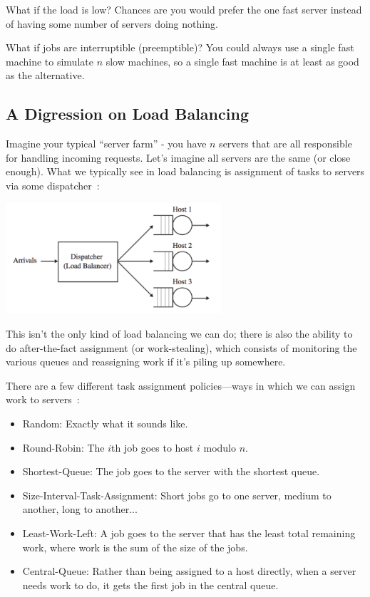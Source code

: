 \documentclass[a4paper]{report}
\begin{document}
What if the load is low? Chances are you would prefer the one fast server instead of having some number of servers doing nothing.

What if jobs are interruptible (preemptible)? You could always use a single fast machine to simulate $n$ slow machines, so a single fast machine is at least as good as the alternative. 

\subsection*{A Digression on Load Balancing}

Imagine your typical ``server farm'' - you have $n$ servers that are all responsible for handling incoming requests. Let's imagine all servers are the same (or close enough). What we typically see in load balancing is assignment of tasks to servers via some dispatcher~\cite{pmd}:

\begin{center}
	\includegraphics[width=0.6\textwidth]{images/central-dispatcher.png}
\end{center}

This isn't the only kind of load balancing we can do; there is also the ability to do after-the-fact assignment (or work-stealing), which consists of monitoring the various queues and reassigning work if it's piling up somewhere.

There are a few different task assignment policies---ways in which we can assign work to servers~\cite{pmd}:

\begin{itemize}
	\item Random: Exactly what it sounds like.
	\item Round-Robin: The $i$th job goes to host $i$ modulo $n$.
	\item Shortest-Queue: The job goes to the server with the shortest queue.
	\item Size-Interval-Task-Assignment: Short jobs go to one server, medium to another, long to another...
	\item Least-Work-Left: A job goes to the server that has the least total remaining work, where work is the sum of the size of the jobs.
	\item Central-Queue: Rather than being assigned to a host directly, when a server needs work to do, it gets the first job in the central queue.
\end{itemize}
\end{document}
